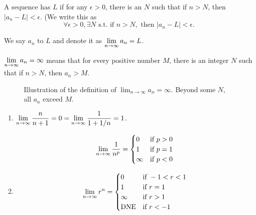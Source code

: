 \begin{defn}
    A sequence has  $L$ if for any $\epsilon > 0$, there is an $N$ such that if $n > N$, then $|a_n - L| < \epsilon$. (We write this as 
    \[\forall \epsilon > 0, \exists N \text{ s.t. if } n > N, \text{ then } |a_n - L| < \epsilon.\]
    
    We say $a_n$  to $L$ and denote it as $\displaystyle\lim_{n\to \infty} a_n = L$.
\end{defn}


\begin{rmk}[Intuition]
    $\displaystyle\lim_{n \to \infty} a_n = \infty$ means that for every positive number $M$, there is an integer $N$ such that if $n > N$, then $a_n > M$.
\end{rmk}
\begin{figure}[ht]
    \centering
    \resizebox{0.6\textwidth}{!}{} %
    \label{fig:sequence}
    \caption{Illustration of the definition of $\lim_{n \to \infty} a_n = \infty$. Beyond some $N$, all $a_n$ exceed $M$.}
\end{figure}
\begin{ex} \leavevmode
\begin{enumerate}
    \item $\displaystyle\lim_{n \to \infty} \dfrac{n}{n+1} = 0 = \displaystyle\lim_{n \to \infty} \dfrac{1}{1+1/n} = 1$.

    \begin{align*}
        \displaystyle\lim_{n \to \infty} \dfrac{1}{n^p} = \begin{cases} 
        0 & \text{if } p > 0 \\
        1 & \text{if } p = 1 \\
        \infty & \text{if } p < 0
        \end{cases}
    \end{align*}
    
    \item 
    \begin{align*}
            \displaystyle\lim_{n \to \infty} r^n = \begin{cases} 
        0 & \text{if } -1 < r < 1 \\
        1 & \text{if } r = 1 \\
        \infty & \text{if } r > 1 \\
        \text{DNE} & \text{if } r < -1
        \end{cases}
    \end{align*}
\end{enumerate}
\end{ex}



